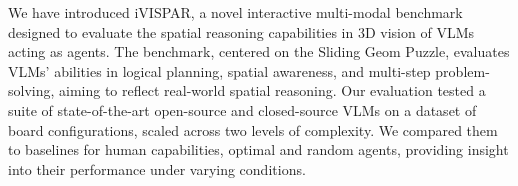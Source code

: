 We have introduced iVISPAR, a novel interactive multi-modal benchmark designed to evaluate the spatial reasoning capabilities in 3D vision of VLMs acting as agents. The benchmark, centered on the Sliding Geom Puzzle, evaluates VLMs' abilities in logical planning, spatial awareness, and multi-step problem-solving, aiming to reflect real-world spatial reasoning. Our evaluation tested a suite of state-of-the-art open-source and closed-source VLMs on a dataset of board configurations, scaled across two levels of complexity. We compared them to baselines for human capabilities, optimal and random agents, providing insight into their performance under varying conditions.